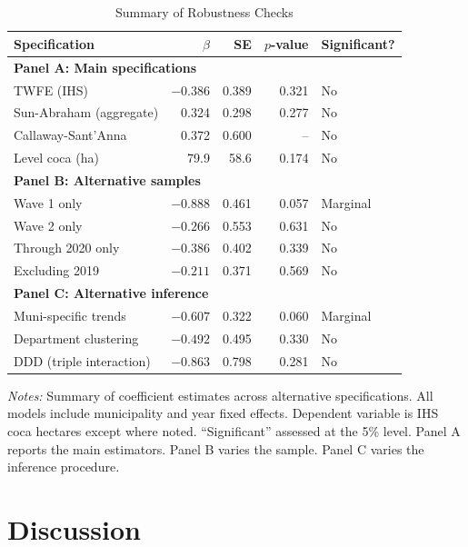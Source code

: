 \documentclass[12pt]{article}
\begin{document}
\begin{table}[H]
\centering
\caption{Summary of Robustness Checks}
\label{tab:robustness_summary}
\begin{tabular}{lrrrl}
\toprule
Specification & $\hat{\beta}$ & SE & $p$-value & Significant? \\
\midrule
\multicolumn{5}{l}{\textbf{Panel A: Main specifications}} \\
TWFE (IHS) & $-0.386$ & 0.389 & 0.321 & No \\
Sun-Abraham (aggregate) & 0.324 & 0.298 & 0.277 & No \\
Callaway-Sant'Anna & 0.372 & 0.600 & -- & No \\
Level coca (ha) & 79.9 & 58.6 & 0.174 & No \\[4pt]
\multicolumn{5}{l}{\textbf{Panel B: Alternative samples}} \\
Wave 1 only & $-0.888$ & 0.461 & 0.057 & Marginal \\
Wave 2 only & $-0.266$ & 0.553 & 0.631 & No \\
Through 2020 only & $-0.386$ & 0.402 & 0.339 & No \\
Excluding 2019 & $-0.211$ & 0.371 & 0.569 & No \\[4pt]
\multicolumn{5}{l}{\textbf{Panel C: Alternative inference}} \\
Muni-specific trends & $-0.607$ & 0.322 & 0.060 & Marginal \\
Department clustering & $-0.492$ & 0.495 & 0.330 & No \\
DDD (triple interaction) & $-0.863$ & 0.798 & 0.281 & No \\
\bottomrule
\end{tabular}
\begin{tablenotes}[flushleft]\small
\item \textit{Notes:} Summary of coefficient estimates across alternative specifications. All models include municipality and year fixed effects. Dependent variable is IHS coca hectares except where noted. ``Significant'' assessed at the 5\% level. Panel A reports the main estimators. Panel B varies the sample. Panel C varies the inference procedure.
\end{tablenotes}
\end{table}

\section{Discussion} \label{sec:discussion}
\end{document}
